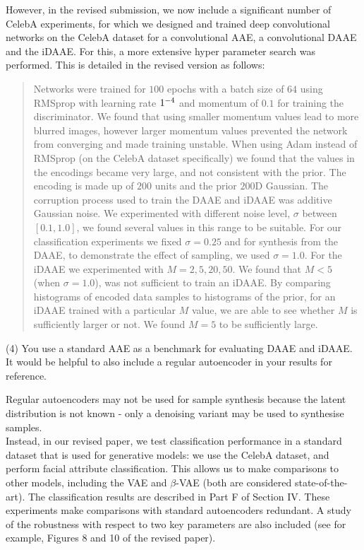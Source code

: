 \documentclass[a4paper,11pt]{article}
\begin{document}
However, in the revised submission, we now include a significant number of CelebA experiments, for which we designed and trained deep convolutional networks on the CelebA dataset for a convolutional AAE, a convolutional DAAE and the iDAAE. For this, a more extensive hyper parameter search was performed. This is detailed in the revised version as follows:

\begin{quote}
{\color{red} Networks were trained for $100$ epochs with a batch size of $64$ using RMSprop with learning rate $1 \time 10^{-4}$ and momentum of $0.1$ for training the discriminator. We found that using smaller momentum values lead to more blurred images, however larger momentum values prevented the network from converging and made training unstable. When using Adam instead of RMSprop (on the CelebA dataset specifically) we found that the values in the encodings became very large, and not consistent with the prior. The encoding is made up of $200$ units and the prior $200$D Gaussian. The corruption process used to train the DAAE and iDAAE was additive Gaussian noise. We experimented with different noise level, $\sigma$ between $[0.1, 1.0]$, we found several values in this range to be suitable. For our classification experiments we fixed $\sigma=0.25$ and for synthesis from the DAAE, to demonstrate the effect of sampling, we used $\sigma=1.0$. For the iDAAE we experimented with $M=2, 5, 20, 50$. We found that $M < 5$ (when $\sigma=1.0$), was not sufficient to train an iDAAE. By comparing histograms of encoded data samples to histograms of the prior, for an iDAAE trained with a particular $M$ value, we are able to see whether $M$ is sufficiently larger or not. We found $M=5$ to be sufficiently large.}
\end{quote}


{\color{blue}
(4) You use a standard AAE as a benchmark for evaluating DAAE and iDAAE. It would be helpful to also include a regular autoencoder in your results for reference.}\newline

Regular autoencoders may not be used for sample synthesis because the latent distribution is not known - only a denoising variant may be used to synthesise samples. \\

Instead, in our revised paper, we test classification performance in a standard dataset that is used for generative models: we use the CelebA dataset, and perform facial attribute classification. This allows us to make comparisons to other models, including the VAE and $\beta$-VAE (both are considered state-of-the-art).  The classification results are described in Part F of Section IV. These experiments make comparisons with standard autoencoders redundant. A study of the robustness with respect to two key parameters are also included (see for example, Figures 8 and 10 of the revised paper). \newline
\end{document}
